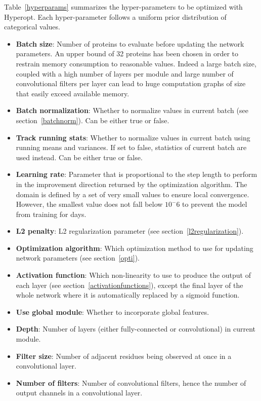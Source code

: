   Table~\ref{hyperparams} summarizes the hyper-parameters to be optimized with Hyperopt.
  Each hyper-parameter follows a uniform prior distribution of categorical values.
  \begin{itemize}
    \item \textbf{Batch size}: Number of proteins to evaluate before updating the network
        parameters. An upper bound of 32 proteins has been chosen in order to restrain
        memory consumption to reasonable values. Indeed a large batch size, coupled
        with a high number of layers per module and large number of convolutional
        filters per layer can lead to huge computation graphs of size that easily exceed
        available memory.
    \item \textbf{Batch normalization}: Whether to normalize values in current batch
        (see section~\ref{batchnorm}). Can be either true or false.
    \item \textbf{Track running stats}: Whether to normalize values in current batch
        using running means and variances. If set to false, statistics of current batch
        are used instead. Can be either true or false.
    \item \textbf{Learning rate}: Parameter that is proportional to the step length
        to perform in the improvement direction returned by the optimization algorithm.
        The domain is defined by a set of very small values to ensure local convergence.
        However, the smallest value does not fall below $10^-6$ to prevent the model
        from training for days.
    \item \textbf{L2 penalty}: L2 regularization parameter (see section~\ref{l2regularization}).
    \item \textbf{Optimization algorithm}: Which optimization method to use for updating
        network parameters (see section~\ref{opti}).
    \item \textbf{Activation function}: Which non-linearity to use to produce the output
        of each layer (see section~\ref{activationfunctions}), except the final layer of
        the whole network where it is automatically replaced by a sigmoid function.
    \item \textbf{Use global module}: Whether to incorporate global features.
    \item \textbf{Depth}: Number of layers (either fully-connected or convolutional) in
        current module.
    \item \textbf{Filter size}: Number of adjacent residues being observed at once in
        a convolutional layer.
    \item \textbf{Number of filters}: Number of convolutional filters, hence the number
        of output channels in a convolutional layer.
  \end{itemize}


